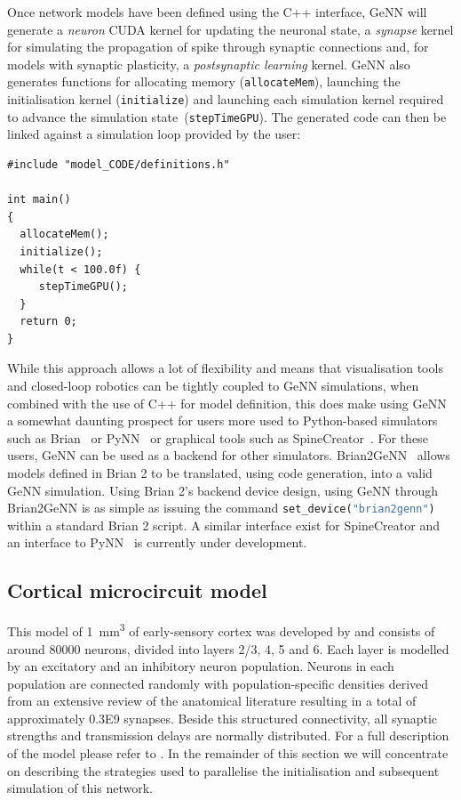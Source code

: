 \documentclass[utf8]{frontiersSCNS} %
\begin{document}
Once network models have been defined using the C++ interface, GeNN will generate a \textit{neuron} CUDA kernel for updating the neuronal state, a \textit{synapse} kernel for simulating the propagation of spike through synaptic connections and, for models with synaptic plasticity, a \textit{postsynaptic learning} kernel. 
GeNN also generates functions for allocating memory (\lstinline{allocateMem}), launching the initialisation kernel (\lstinline{initialize}) and launching each simulation kernel required to advance the simulation state~(\lstinline{stepTimeGPU}).
The generated code can then be linked against a simulation loop provided by the user:
%
\begin{lstlisting}
#include "model_CODE/definitions.h"

int main()
{
  allocateMem();
  initialize();
  while(t < 100.0f) {
     stepTimeGPU();
  }
  return 0;
}
\end{lstlisting}
%
While this approach allows a lot of flexibility and means that visualisation tools and closed-loop robotics can be tightly coupled to GeNN simulations, when combined with the use of C++ for model definition, this does make using GeNN a somewhat daunting prospect for users more used to Python-based simulators such as Brian~\citep{Stimberg2014} or PyNN~\citep{Davison2008a} or graphical tools such as SpineCreator~\citep{Cope2017}.
For these users, GeNN can be used as a backend for other simulators.
Brian2GeNN~\citep{Stimberg2018} allows models defined in Brian 2 to be translated, using code generation, into a valid GeNN simulation. 
Using Brian 2's backend device design, using GeNN through Brian2GeNN is as simple as issuing the command \lstinline[language=python]{set_device("brian2genn")} within a standard Brian 2 script. 
A similar interface exist for SpineCreator and an interface to PyNN~\citep{Davison2008a} is currently under development.
 
\subsection{Cortical microcircuit model}
\label{sec:method/microcircuit}
This model of \SI{1}{\milli\metre\cubed} of early-sensory cortex was developed by \citet{Potjans2012} and consists of around \num{80000} neurons, divided into layers 2/3, 4, 5 and 6.
Each layer is modelled by an excitatory and an inhibitory neuron population.
Neurons in each population are connected randomly with population-specific densities derived from an extensive review of the anatomical literature resulting in a total of approximately \num{0.3E9} synapses.
Beside this structured connectivity, all synaptic strengths and transmission delays are normally distributed.
For a full description of the model please refer to \citeauthor{Potjans2012}.
In the remainder of this section we will concentrate on describing the strategies used to parallelise the initialisation and subsequent simulation of this network.
\end{document}
